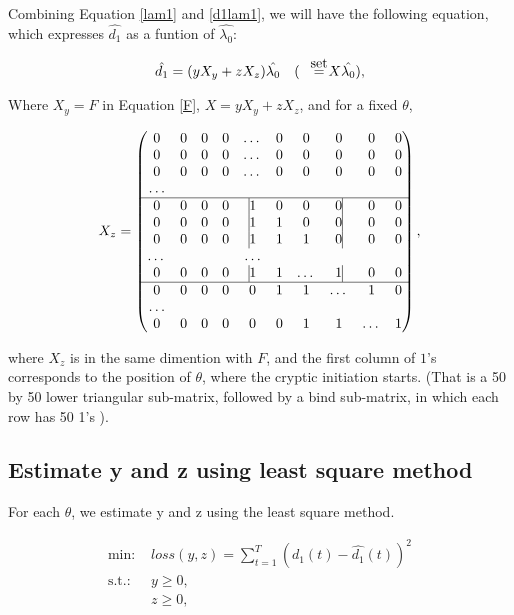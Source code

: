 \documentclass{article}
\newcommand\myset{\stackrel{\mathclap{\normalfont\mbox{set}}}{=}}
\begin{document}
Combining Equation \ref{lam1} and \ref{d1lam1}, we will have the following equation, which expresses $\hat{d_1}$ as a funtion of $\hat{\lambda_0}$:

\begin{equation}
\hat{d_1}=(yX_y+zX_z)\hat{\lambda_0}\quad (\quad \myset X \hat{\lambda_0}),
\end{equation}

Where $X_y = F$ in Equation \ref{F}, $X = yX_y+zX_z$, and for a fixed $\theta$,

\begin{equation}\label{Xz}
X_z=\begin{pmatrix}
0&0&0&0&\dots&0&0&0&0&0\\
0&0&0&0&\dots&0&0&0&0&0\\
0&0&0&0&\dots&0&0&0&0&0\\
\dots \\
\hline
0&0&0&0&\vline1&0&0&0\vline&0&0\\
0&0&0&0&\vline1&1&0&0\vline&0&0\\
0&0&0&0&\vline1&1&1&0\vline&0&0\\
\dots &&&& \dots \\
0&0&0&0&\vline1&1&\dots&1\vline&0&0\\
\hline
0&0&0&0&0&1&1&\dots&1&0\\
\dots \\
0&0&0&0&0&0&1&1&\dots&1\\
\end{pmatrix},
\end{equation}




where $X_z$ is in the same dimention with $F$, and the first column of $1$'s corresponds to the position of $\theta$, where the cryptic initiation starts. (That is a 50 by 50 lower triangular sub-matrix, followed by a bind sub-matrix, in which each row has 50 1's ).
\newline

\subsection{Estimate y and z using least square method }

For each $\theta$, we estimate y and z using the least square method.

\begin{align*}
\text{min: } &loss(y,z) = \sum_{t=1}^{T} (d_1(t)-\hat{d_1}(t))^2\\
\text{s.t.: } &y \ge 0,\\
&z \ge 0,
\end{align*}
\end{document}
